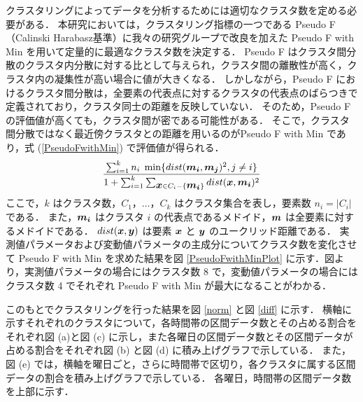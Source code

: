 \documentclass[technicalreport]{ieicej}
\begin{document}
クラスタリングによってデータを分析するためには適切なクラスタ数を定める必要がある．
本研究においては，クラスタリング指標の一つである Pseudo F（Calinski Harabasz基準）\cite{liu2010understanding}に我々の研究グループで改良を加えた Pseudo F with Min\cite{kanajiri} を用いて定量的に最適なクラスタ数を決定する．
Pseudo F はクラスタ間分散のクラスタ内分散に対する比として与えられ，クラスタ間の離散性が高く，クラスタ内の凝集性が高い場合に値が大きくなる．
しかしながら，Pseudo F におけるクラスタ間分散は，全要素の代表点に対するクラスタの代表点のばらつきで定義されており，クラスタ同士の距離を反映していない．
そのため，Pseudo F の評価値が高くても，クラスタ間が密である可能性がある．
そこで，クラスタ間分散ではなく最近傍クラスタとの距離を用いるのがPseudo F with Min であり，式 (\ref{PseudoFwithMin}) で評価値が得られる．
\begin{equation}
\frac{\sum^k_{i=1} n_{i}\hspace{0.1cm} \min \{ dist(\mbox{\boldmath $m_{i}$},\mbox{\boldmath $m_j$})^2,j \neq i \}}{1 + \sum^k_{i=1} \sum_{\mbox{\boldmath $x$} \in C_i - \{\mbox{\boldmath $m_i$}\}} dist(\mbox{\boldmath $x$},\mbox{\boldmath $m_{i}$})^2}
\label{PseudoFwithMin}
\end{equation}
ここで，$k$ はクラスタ数，$C_1，\ldots，C_k$ はクラスタ集合を表し，要素数 $n_i=|C_i|$ である．
また，$\mbox{\boldmath $m_i$}$ はクラスタ $i$ の代表点であるメドイド\cite{mouratidis2005medoid}，$\mbox{\boldmath $m$}$ は全要素に対するメドイドである．
$dist(\mbox{\boldmath $x$},\mbox{\boldmath $y$})$ は要素 $\mbox{\boldmath $x$}$ と $\mbox{\boldmath $y$}$ のユークリッド距離である．
実測値パラメータおよび変動値パラメータの主成分についてクラスタ数を変化させて Pseudo F with Min を求めた結果を図 \ref{PseudoFwithMinPlot} に示す．図より，実測値パラメータの場合にはクラスタ数 8 で，変動値パラメータの場合にはクラスタ数 4 でそれぞれ Pseudo F with Min が最大になることがわかる．

このもとでクラスタリングを行った結果を図 \ref{norm} と図 \ref{diff} に示す．
横軸に示すそれぞれのクラスタについて，各時間帯の区間データ数とその占める割合をそれぞれ図 (a)と図 (c) に示し，また各曜日の区間データ数とその区間データが占める割合をそれぞれ図 (b) と図 (d) に積み上げグラフで示している．
また，図 (e) では，横軸を曜日ごと，さらに時間帯で区切り，各クラスタに属する区間データの割合を積み上げグラフで示している．
各曜日，時間帯の区間データ数を上部に示す．
\end{document}
